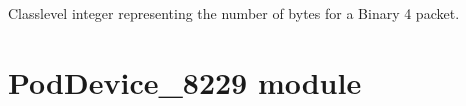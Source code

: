 \documentclass[letterpaper,10pt,english]{sphinxmanual}
\begin{document}
\begin{fulllineitems}
\begin{fulllineitems}
\end{fulllineitems}


\begin{fulllineitems}
\label{\detokenize{PodDevice_8206HR:PodDevice_8206HR.POD_8206HR.__B4LENGTH}}
\pysigstartsignatures
{}
\pysigstopsignatures
\sphinxAtStartPar
Class\sphinxhyphen{}level integer representing the number of bytes for a Binary 4 packet.

\end{fulllineitems}


\end{fulllineitems}


\sphinxstepscope


\section{PodDevice\_8229 module}
\label{\detokenize{PodDevice_8229:module-PodDevice_8229}}\label{\detokenize{PodDevice_8229:poddevice-8229-module}}\label{\detokenize{PodDevice_8229::doc}}
\end{document}

